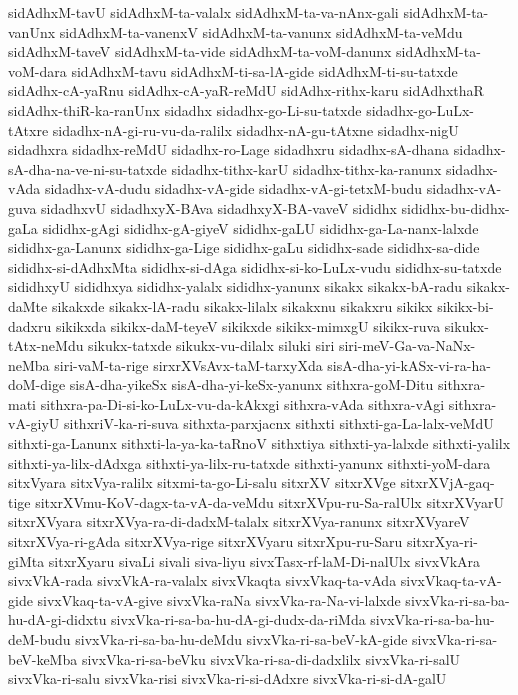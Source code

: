 {sidAdhxM-tavU
sidAdhxM-ta-valalx
sidAdhxM-ta-va-nAnx-gali
sidAdhxM-ta-vanUnx
sidAdhxM-ta-vanenxV
sidAdhxM-ta-vanunx
sidAdhxM-ta-veMdu
sidAdhxM-taveV
sidAdhxM-ta-vide
sidAdhxM-ta-voM-danunx
sidAdhxM-ta-voM-dara
sidAdhxM-tavu
sidAdhxM-ti-sa-lA-gide
sidAdhxM-ti-su-tatxde
sidAdhx-cA-yaRnu
sidAdhx-cA-yaR-reMdU
sidAdhx-rithx-karu
sidAdhxthaR
sidAdhx-thiR-ka-ranUnx
sidadhx
sidadhx-go-Li-su-tatxde
sidadhx-go-LuLx-tAtxre
sidadhx-nA-gi-ru-vu-da-ralilx
sidadhx-nA-gu-tAtxne
sidadhx-nigU
sidadhxra
sidadhx-reMdU
sidadhx-ro-Lage
sidadhxru
sidadhx-sA-dhana
sidadhx-sA-dha-na-ve-ni-su-tatxde
sidadhx-tithx-karU
sidadhx-tithx-ka-ranunx
sidadhx-vAda
sidadhx-vA-dudu
sidadhx-vA-gide
sidadhx-vA-gi-tetxM-budu
sidadhx-vA-guva
sidadhxvU
sidadhxyX-BAva
sidadhxyX-BA-vaveV
sididhx
sididhx-bu-didhx-gaLa
sididhx-gAgi
sididhx-gA-giyeV
sididhx-gaLU
sididhx-ga-La-nanx-lalxde
sididhx-ga-Lanunx
sididhx-ga-Lige
sididhx-gaLu
sididhx-sade
sididhx-sa-dide
sididhx-si-dAdhxMta
sididhx-si-dAga
sididhx-si-ko-LuLx-vudu
sididhx-su-tatxde
sididhxyU
sididhxya
sididhx-yalalx
sididhx-yanunx
sikakx
sikakx-bA-radu
sikakx-daMte
sikakxde
sikakx-lA-radu
sikakx-lilalx
sikakxnu
sikakxru
sikikx
sikikx-bi-dadxru
sikikxda
sikikx-daM-teyeV
sikikxde
sikikx-mimxgU
sikikx-ruva
sikukx-tAtx-neMdu
sikukx-tatxde
sikukx-vu-dilalx
siluki
siri
siri-meV-Ga-va-NaNx-neMba
siri-vaM-ta-rige
sirxrXVsAvx-taM-tarxyXda
sisA-dha-yi-kASx-vi-ra-ha-doM-dige
sisA-dha-yikeSx
sisA-dha-yi-keSx-yanunx
sithxra-goM-Ditu
sithxra-mati
sithxra-pa-Di-si-ko-LuLx-vu-da-kAkxgi
sithxra-vAda
sithxra-vAgi
sithxra-vA-giyU
sithxriV-ka-ri-suva
sithxta-parxjacnx
sithxti
sithxti-ga-La-lalx-veMdU
sithxti-ga-Lanunx
sithxti-la-ya-ka-taRnoV
sithxtiya
sithxti-ya-lalxde
sithxti-yalilx
sithxti-ya-lilx-dAdxga
sithxti-ya-lilx-ru-tatxde
sithxti-yanunx
sithxti-yoM-dara
sitxVyara
sitxVya-ralilx
sitxmi-ta-go-Li-salu
sitxrXV
sitxrXVge
sitxrXVjA-gaq-tige
sitxrXVmu-KoV-dagx-ta-vA-da-veMdu
sitxrXVpu-ru-Sa-ralUlx
sitxrXVyarU
sitxrXVyara
sitxrXVya-ra-di-dadxM-talalx
sitxrXVya-ranunx
sitxrXVyareV
sitxrXVya-ri-gAda
sitxrXVya-rige
sitxrXVyaru
sitxrXpu-ru-Saru
sitxrXya-ri-giMta
sitxrXyaru
sivaLi
sivali
siva-liyu
sivxTasx-rf-laM-Di-nalUlx
sivxVkAra
sivxVkA-rada
sivxVkA-ra-valalx
sivxVkaqta
sivxVkaq-ta-vAda
sivxVkaq-ta-vA-gide
sivxVkaq-ta-vA-give
sivxVka-raNa
sivxVka-ra-Na-vi-lalxde
sivxVka-ri-sa-ba-hu-dA-gi-didxtu
sivxVka-ri-sa-ba-hu-dA-gi-dudx-da-riMda
sivxVka-ri-sa-ba-hu-deM-budu
sivxVka-ri-sa-ba-hu-deMdu
sivxVka-ri-sa-beV-kA-gide
sivxVka-ri-sa-beV-keMba
sivxVka-ri-sa-beVku
sivxVka-ri-sa-di-dadxlilx
sivxVka-ri-salU
sivxVka-ri-salu
sivxVka-risi
sivxVka-ri-si-dAdxre
sivxVka-ri-si-dA-galU
}
